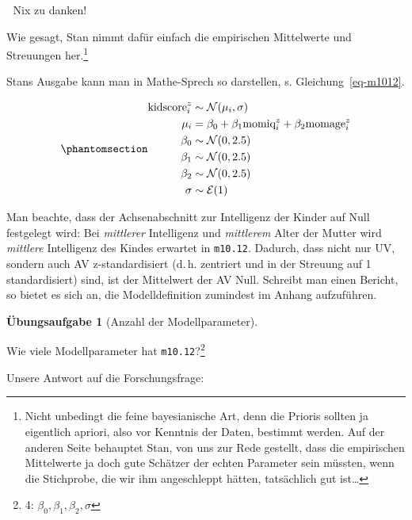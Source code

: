 \documentclass[
  ngerman,
  letterpaper,
  twoside,
  open=any]{scrbook}
\theoremstyle{definition}
\theoremstyle{plain}
\theoremstyle{definition}
\newtheorem{exercise}{Übungsaufgabe}[chapter]
\theoremstyle{definition}
\theoremstyle{definition}
\theoremstyle{definition}
\newtheorem{exercise}{Übungsaufgabe}[chapter]
\theoremstyle{remark}
\begin{document}
\begin{displayquote}
🤖 Nix zu danken!
\end{displayquote}

Wie gesagt, Stan nimmt dafür einfach die empirischen Mittelwerte und
Streuungen her.\footnote{Nicht unbedingt die feine bayesianische Art,
  denn die Prioris sollten ja eigentlich apriori, also vor Kenntnis der
  Daten, bestimmt werden. Auf der anderen Seite behauptet Stan, von uns
  zur Rede gestellt, dass die empirischen Mittelwerte ja doch gute
  Schätzer der echten Parameter sein müssten, wenn die Stichprobe, die
  wir ihm angeschleppt hätten, tatsächlich gut ist\ldots{}}

Stans Ausgabe kann man in Mathe-Sprech so darstellen, s.
Gleichung~\ref{eq-m1012}.

\begin{equation}\protect\phantomsection\label{eq-m1012}{
\begin{aligned}
\text{kidscore}^z_i  &\sim \mathcal{N}(\mu_i,\sigma)\\
\mu_i &= \beta_0 + \beta_1\text{momiq}_i^z + \beta_2\text{momage}_i^z \\
\beta_0 &\sim \mathcal{N}(0,2.5)\\
\beta_1 &\sim \mathcal{N}(0,2.5)\\
\beta_2 &\sim \mathcal{N}(0,2.5)\\
\sigma &\sim \mathcal{E}(1)
\end{aligned}
}\end{equation}

Man beachte, dass der Achsenabschnitt zur Intelligenz der Kinder auf
Null festgelegt wird: Bei \emph{mittlerer} Intelligenz und
\emph{mittlerem} Alter der Mutter wird \emph{mittlere} Intelligenz des
Kindes erwartet in \texttt{m10.12}. Dadurch, dass nicht nur UV, sondern
auch AV z-standardisiert (d.\,h. zentriert und in der Streuung auf 1
standardisiert) sind, ist der Mittelwert der AV Null. Schreibt man einen
Bericht, so bietet es sich an, die Modelldefinition zumindest im Anhang
aufzuführen.

\begin{exercise}[Anzahl der
Modellparameter]\protect\hypertarget{exr-anz-mod-m1011}{}\label{exr-anz-mod-m1011}

Wie viele Modellparameter hat \texttt{m10.12}?\footnote{4:
  \(\beta_0, \beta_1, \beta_2, \sigma\)}

\end{exercise}

Unsere Antwort auf die Forschungsfrage:
\end{document}
